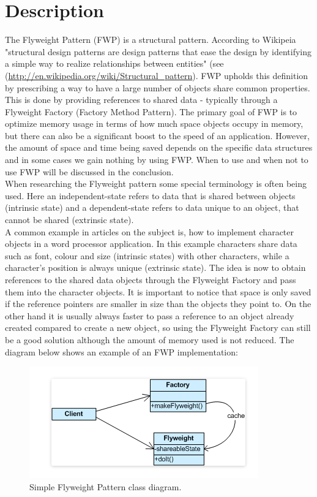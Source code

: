 \section{Description}
The Flyweight Pattern (FWP) is a structural pattern. According to Wikipeia "structural design patterns are design patterns that ease the design by identifying a simple way to realize relationships between entities" (see (\url{http://en.wikipedia.org/wiki/Structural_pattern}). FWP upholds this definition by prescribing a way to have a large number of objects share common properties. This is done by providing references to shared data - typically through a Flyweight Factory (Factory Method Pattern). The primary goal of FWP is to optimize memory usage in terms of how much space objects occupy in memory, but there can also be a significant boost to the speed of an application. However, the amount of space and time being saved depends on the specific data structures and in some cases we gain nothing by using FWP. When to use and when not to use FWP will be discussed in the conclusion.\\

When researching the Flyweight pattern some special terminology is often being used. Here an independent-state refers to data that is shared between objects (intrinsic state) and a dependent-state refers to data unique to an object, that cannot be shared (extrinsic state).\\

A common example in articles on the subject is, how to implement character objects in a word processor application. In this example characters share data such as font, colour and size (intrinsic states) with other characters, while a character's position is always unique (extrinsic state). The idea is now to obtain references to the shared data objects through the Flyweight Factory and pass them into the character objects. It is important to notice that space is only saved if the reference pointers are smaller in size than the objects they point to. On the other hand it is usually always faster to pass a reference to an object already created compared to create a new object, so using the Flyweight Factory can still be a good solution although the amount of memory used is not reduced. The diagram below shows an example of an FWP implementation:

\begin{figure}[h]
	\centering
	\includegraphics[width=0.7\linewidth]{Content/Pattern_example.png}
	\caption{Simple Flyweight Pattern class diagram.}
	\label{fig:Flyweight Pattern}
\end{figure}

 